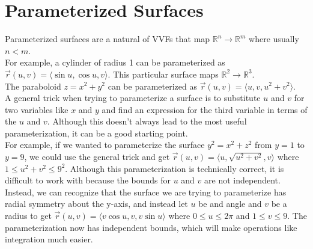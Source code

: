 \section{Parameterized Surfaces}
\noindent
Parameterized surfaces are a natural of VVFs that map $\mathbb{R}^n \to \mathbb{R}^m$ where usually $n<m$.\\

\noindent
For example, a cylinder of radius 1 can be parameterized as $\vec{r}(u,v) = \langle\sin{u}, \cos{u}, v\rangle$. This particular surface maps $\mathbb{R}^2 \to \mathbb{R}^3$.\\
The paraboloid $z = x^2 + y^2$ can be parameterized as $\vec{r}(u,v)=\langle u, v, u^2+v^2 \rangle$.\\

\noindent
A general trick when trying to parameterize a surface is to substitute $u$ and $v$ for two variables like $x$ and $y$ and find an expression for the third variable in terms of the $u$ and $v$. Although this doesn’t always lead to the most useful parameterization, it can be a good starting point.\\

\noindent
For example, if we wanted to parameterize the surface $y^2=x^2+z^2$ from $y=1$ to $y=9$, we could use the general trick and get $\vec{r}(u,v) = \langle u,\sqrt{u^2+v^2},v\rangle$ where $1\leq u^2+v^2\leq 9^2$. Although this parameterization is technically correct, it is difficult to work with because the bounds for $u$ and $v$ are not independent.\\
Instead, we can recognize that the surface we are trying to parameterize has radial symmetry about the y-axis, and instead let $u$ be and angle and $v$ be a radius to get $\vec{r}(u,v) = \langle v\cos{u}, v, v\sin{u}\rangle$ where $0\leq u\leq 2\pi$ and $1\leq v\leq 9$. The parameterization now has independent bounds, which will make operations like integration much easier.

